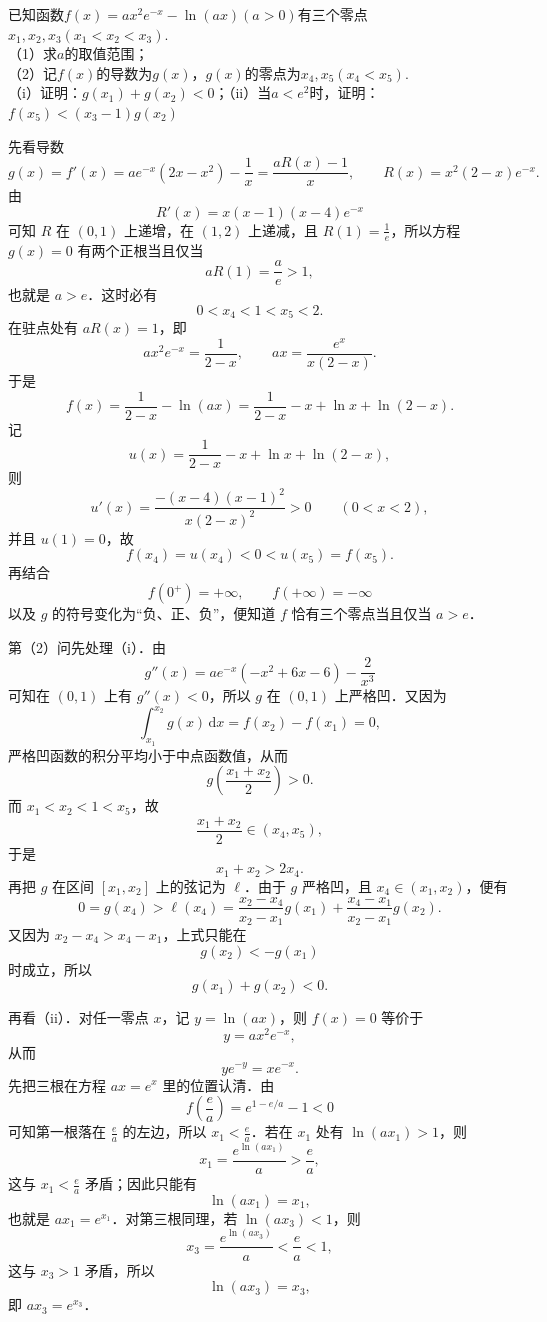 \begin{example}[零点与极值题]
已知函数$f(x)=ax^{2}e^{-x}-\ln(ax)(a>0)$有三个零点$x_{1},x_{2},x_{3}(x_{1}<x_{2}<x_{3})$.  \\
（1）求$a$的取值范围；  \\
（2）记$f(x)$的导数为$g(x)$，$g(x)$的零点为$x_{4},x_{5}(x_{4}<x_{5})$.  \\
（i）证明：$g(x_{1})+g(x_{2})<0$；（ii）当$a<e^{2}$时，证明：$f(x_{5})<(x_{3}-1)g(x_{2})$
\end{example}
\begin{solution}
先看导数
\[
g(x)=f'(x)=ae^{-x}(2x-x^2)-\frac1x=\frac{aR(x)-1}{x},\qquad R(x)=x^2(2-x)e^{-x}.
\]
由
\[
R'(x)=x(x-1)(x-4)e^{-x}
\]
可知 $R$ 在 $(0,1)$ 上递增，在 $(1,2)$ 上递减，且 $R(1)=\frac1e$，所以方程 $g(x)=0$ 有两个正根当且仅当
\[
aR(1)=\frac ae>1,
\]
也就是 $a>e$．这时必有
\[
0<x_4<1<x_5<2.
\]
在驻点处有 $aR(x)=1$，即
\[
ax^2e^{-x}=\frac1{2-x},\qquad ax=\frac{e^x}{x(2-x)}.
\]
于是
\[
f(x)=\frac1{2-x}-\ln(ax)=\frac1{2-x}-x+\ln x+\ln(2-x).
\]
记
\[
u(x)=\frac1{2-x}-x+\ln x+\ln(2-x),
\]
则
\[
u'(x)=\frac{-(x-4)(x-1)^2}{x(2-x)^2}>0\qquad(0<x<2),
\]
并且 $u(1)=0$，故
\[
f(x_4)=u(x_4)<0<u(x_5)=f(x_5).
\]
再结合
\[
f(0^+)=+\infty,\qquad f(+\infty)=-\infty
\]
以及 $g$ 的符号变化为“负、正、负”，便知道 $f$ 恰有三个零点当且仅当 $a>e$．

第（2）问先处理（i）．由
\[
g''(x)=ae^{-x}(-x^2+6x-6)-\frac2{x^3}
\]
可知在 $(0,1)$ 上有 $g''(x)<0$，所以 $g$ 在 $(0,1)$ 上严格凹．又因为
\[
\int_{x_1}^{x_2}g(x)\,\mathrm{d}x=f(x_2)-f(x_1)=0,
\]
严格凹函数的积分平均小于中点函数值，从而
\[
g\!\left(\frac{x_1+x_2}{2}\right)>0.
\]
而 $x_1<x_2<1<x_5$，故
\[
\frac{x_1+x_2}{2}\in(x_4,x_5),
\]
于是
\[
x_1+x_2>2x_4.
\]
再把 $g$ 在区间 $[x_1,x_2]$ 上的弦记为 $\ell$．由于 $g$ 严格凹，且 $x_4\in(x_1,x_2)$，便有
\[
0=g(x_4)>\ell(x_4)
=\frac{x_2-x_4}{x_2-x_1}g(x_1)+\frac{x_4-x_1}{x_2-x_1}g(x_2).
\]
又因为 $x_2-x_4>x_4-x_1$，上式只能在
\[
g(x_2)<-g(x_1)
\]
时成立，所以
\[
g(x_1)+g(x_2)<0.
\]

再看（ii）．对任一零点 $x$，记 $y=\ln(ax)$，则 $f(x)=0$ 等价于
\[
y=ax^2e^{-x},
\]
从而
\[
y e^{-y}=x e^{-x}. \tag{1}
\]
先把三根在方程 $ax=e^x$ 里的位置认清．由
\[
f\!\left(\frac ea\right)=e^{1-e/a}-1<0
\]
可知第一根落在 $\frac ea$ 的左边，所以 $x_1<\frac ea$．若在 $x_1$ 处有 $\ln(ax_1)>1$，则
\[
x_1=\frac{e^{\ln(ax_1)}}a>\frac ea,
\]
这与 $x_1<\frac ea$ 矛盾；因此只能有
\[
\ln(ax_1)=x_1,
\]
也就是 $ax_1=e^{x_1}$．对第三根同理，若 $\ln(ax_3)<1$，则
\[
x_3=\frac{e^{\ln(ax_3)}}a<\frac ea<1,
\]
这与 $x_3>1$ 矛盾，所以
\[
\ln(ax_3)=x_3,
\]
即 $ax_3=e^{x_3}$．


\end{solution}
